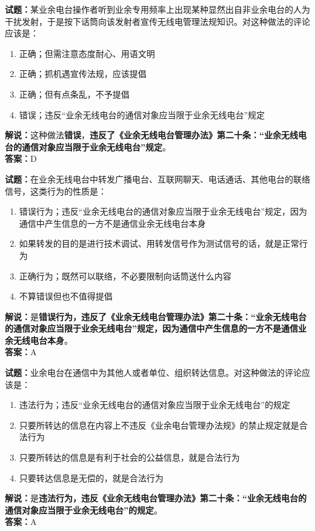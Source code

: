 \documentclass{ctexbook}
\begin{document}
\vspace{1em}

\textbf{试题：}某业余电台操作者听到业余专用频率上出现某种显然出自非业余电台的人为干扰发射，于是按下话筒向该发射者宣传无线电管理法规知识。对这种做法的评论应该是：
\begin{enumerate}[leftmargin=3em]
  \item 正确；但需注意态度耐心、用语文明
  \item 正确；抓机遇宣传法规，应该提倡
  \item 正确；但有点条乱，不予提倡
  \item 错误；违反“业余无线电台的通信对象应当限于业余无线电台”规定%
\end{enumerate}
\noindent\textbf{解说：}这种做法\textbf{错误}，\textbf{违反了《业余无线电台管理办法》第二十条：“业余无线电台的通信对象应当限于业余无线电台”规定}。\\\noindent\textbf{答案：}D

\vspace{1em}

\textbf{试题：}在业余无线电台中转发广播电台、互联网聊天、电话通话、其他电台的联络信号，这类行为的性质是：
\begin{enumerate}[leftmargin=3em]
  \item 错误行为；违反“业余无线电台的通信对象应当限于业余无线电台”规定，因为通信中产生信息的一方不是通信业余无线电台本身
  \item 如果转发的目的是进行技术调试、用转发信号作为测试信号的话，就是正常行为
  \item 正确行为；既然可以联络，不必要限制向话筒送什么内容
  \item 不算错误但也不值得提倡
\end{enumerate}
\noindent\textbf{解说：}是\textbf{错误行为，违反了《业余无线电台管理办法》第二十条：“业余无线电台的通信对象应当限于业余无线电台”规定，因为通信中产生信息的一方不是通信业余无线电台本身}。\\\noindent\textbf{答案：}A

\vspace{1em}

\textbf{试题：}业余电台在通信中为其他人或者单位、组织转达信息。对这种做法的评论应该是：
\begin{enumerate}[leftmargin=3em]
  \item 违法行为；违反“业余无线电台的通信对象应当限于业余无线电台”的规定
  \item 只要所转达的信息在内容上不违反《业余电台管理办法规》的禁止规定就是合法行为
  \item 只要所转达的信息是有利于社会的公益信息，就是合法行为
  \item 只要转达信息是无偿的，就是合法行为
\end{enumerate}
\noindent\textbf{解说：}是\textbf{违法行为，违反《业余无线电台管理办法》第二十条：“业余无线电台的通信对象应当限于业余无线电台”的规定}。\\\noindent\textbf{答案：}A
\end{document}
